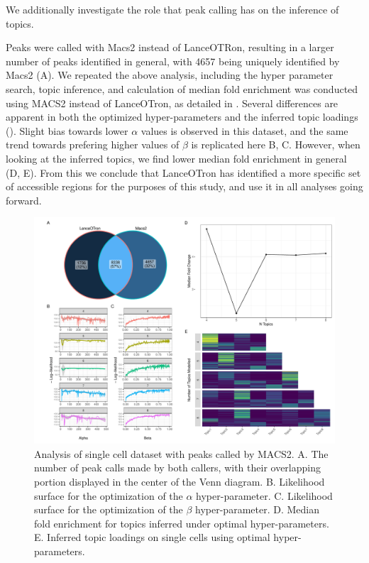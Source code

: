 We additionally investigate the role that peak calling has on the inference of topics. 

Peaks were called with Macs2 instead of LanceOTRon, resulting in a larger number of peaks identified in general, with 4657 being uniquely identified by Macs2 (A). We repeated the above analysis, including the hyper parameter search, topic inference, and calculation of median fold enrichment was conducted using MACS2 instead of LanceOTron, as detailed in . Several differences are apparent in both the optimized hyper-parameters and the inferred topic loadings (). Slight bias towards lower $\alpha$ values is observed in this dataset, and the same trend towards prefering higher values of $\beta$ is replicated here B, C. However, when looking at the inferred topics, we find lower median fold enrichment in general (D, E). From this we conclude that LanceOTron has identified a more specific set of accessible regions for the purposes of this study, and use it in all analyses going forward. 

\begin{figure}
  \centering
  \includegraphics[width=\textwidth]{plot/ch4/sc_macs2.pdf}
  \caption{Analysis of single cell dataset with peaks called by MACS2. A. The number of peak calls made by both callers, with their overlapping portion displayed in the center of the Venn diagram. B. Likelihood surface for the optimization of the $\alpha$ hyper-parameter. C. Likelihood surface for the optimization of the $\beta$ hyper-parameter. D. Median fold enrichment for topics inferred under optimal hyper-parameters. E. Inferred topic loadings on single cells using optimal hyper-parameters.}
  \label{fig:sc_macs2}
\end{figure}

